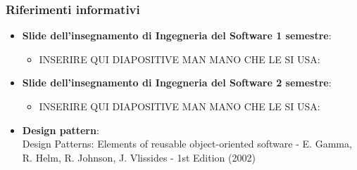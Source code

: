 \documentclass[../PianoDiQualifica.tex]{subfiles}
\begin{document}
			\subsubsection{Riferimenti informativi}	
				\begin{itemize}
					\item \textbf{Slide dell'insegnamento di Ingegneria del Software
					1 semestre}:
						\begin{itemize}
							\item INSERIRE QUI DIAPOSITIVE MAN MANO CHE LE SI USA:\\
							
							\end{itemize}
					\item \textbf{Slide dell'insegnamento di Ingegneria del Software
					2 semestre}:
						\begin{itemize}
							\item INSERIRE QUI DIAPOSITIVE MAN MANO CHE LE SI USA:\\
							
							\end{itemize}
					\item \textbf{Design pattern}:\\
					Design Patterns: Elements of reusable object-oriented software - E. Gamma, R. Helm, R. Johnson, J. Vlissides - 1st Edition (2002) 
					\end{itemize}
\end{document}
